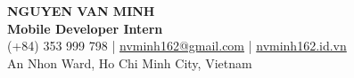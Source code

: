 \begin{center}
    {\fontsize{25}{28}\selectfont\bfseries NGUYEN VAN MINH}\\[4pt]
    {\large\bfseries Mobile Developer Intern}\\[6pt]
    \small (+84) 353 999 798 \;|\; \href{mailto:nvminh162@gmail.com}{nvminh162@gmail.com} \;|\; \href{https://nvminh162.id.vn}{nvminh162.id.vn}\\[3pt]
    \small An Nhon Ward, Ho Chi Minh City, Vietnam
    \\ \vspace{-1pt}
\end{center}
